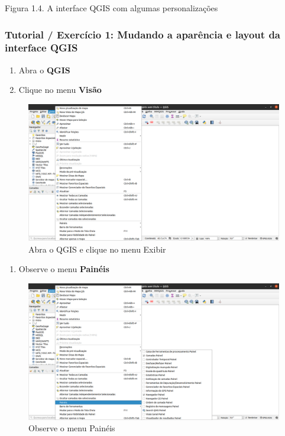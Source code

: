 \documentclass[
]{book}
\providecommand{\tightlist}{%
  \setlength{\itemsep}{0pt}\setlength{\parskip}{0pt}}
\begin{document}
Figura 1.4. A interface QGIS com algumas personalizações

\hypertarget{tutorial-exercuxedcio-1-mudando-a-aparuxeancia-e-layout-da-interface-qgis}{%
\subsubsection{\texorpdfstring{\textbf{Tutorial / Exercício 1: Mudando a aparência e layout da interface QGIS}}{Tutorial / Exercício 1: Mudando a aparência e layout da interface QGIS}}\label{tutorial-exercuxedcio-1-mudando-a-aparuxeancia-e-layout-da-interface-qgis}}

\begin{enumerate}
\def\labelenumi{\arabic{enumi}.}
\tightlist
\item
  Abra o \textbf{QGIS}
\item
  Clique no menu \textbf{Visão}
\end{enumerate}

\begin{figure}
\centering
\includegraphics{media/modulo1/ex01-01.png}
\caption{Abra o QGIS e clique no menu Exibir}
\end{figure}

\begin{enumerate}
\def\labelenumi{\arabic{enumi}.}
\setcounter{enumi}{2}
\tightlist
\item
  Observe o menu \textbf{Painéis}
\end{enumerate}

\begin{figure}
\centering
\includegraphics{media/modulo1/ex01-02.png}
\caption{Observe o menu Painéis}
\end{figure}
\end{document}
